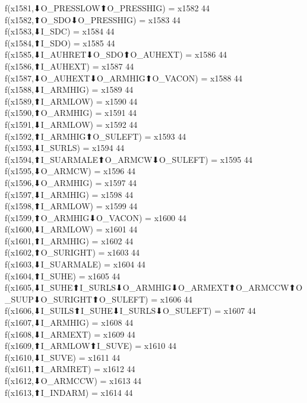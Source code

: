f(x1581,⬇O_PRESSLOW⬆O_PRESSHIG) = x1582 {44} \\
f(x1582,⬆O_SDO⬇O_PRESSHIG) = x1583 {44} \\
f(x1583,⬇I_SDC) = x1584 {44} \\
f(x1584,⬆I_SDO) = x1585 {44} \\
f(x1585,⬇I_AUHRET⬇O_SDO⬆O_AUHEXT) = x1586 {44} \\
f(x1586,⬆I_AUHEXT) = x1587 {44} \\
f(x1587,⬇O_AUHEXT⬇O_ARMHIG⬆O_VACON) = x1588 {44} \\
f(x1588,⬇I_ARMHIG) = x1589 {44} \\
f(x1589,⬆I_ARMLOW) = x1590 {44} \\
f(x1590,⬆O_ARMHIG) = x1591 {44} \\
f(x1591,⬇I_ARMLOW) = x1592 {44} \\
f(x1592,⬆I_ARMHIG⬆O_SULEFT) = x1593 {44} \\
f(x1593,⬇I_SURLS) = x1594 {44} \\
f(x1594,⬆I_SUARMALE⬆O_ARMCW⬇O_SULEFT) = x1595 {44} \\
f(x1595,⬇O_ARMCW) = x1596 {44} \\
f(x1596,⬇O_ARMHIG) = x1597 {44} \\
f(x1597,⬇I_ARMHIG) = x1598 {44} \\
f(x1598,⬆I_ARMLOW) = x1599 {44} \\
f(x1599,⬆O_ARMHIG⬇O_VACON) = x1600 {44} \\
f(x1600,⬇I_ARMLOW) = x1601 {44} \\
f(x1601,⬆I_ARMHIG) = x1602 {44} \\
f(x1602,⬆O_SURIGHT) = x1603 {44} \\
f(x1603,⬇I_SUARMALE) = x1604 {44} \\
f(x1604,⬆I_SUHE) = x1605 {44} \\
f(x1605,⬇I_SUHE⬆I_SURLS⬇O_ARMHIG⬇O_ARMEXT⬆O_ARMCCW⬆O_SUUP⬇O_SURIGHT⬆O_SULEFT) = x1606 {44} \\
f(x1606,⬇I_SUILS⬆I_SUHE⬇I_SURLS⬇O_SULEFT) = x1607 {44} \\
f(x1607,⬇I_ARMHIG) = x1608 {44} \\
f(x1608,⬇I_ARMEXT) = x1609 {44} \\
f(x1609,⬆I_ARMLOW⬆I_SUVE) = x1610 {44} \\
f(x1610,⬇I_SUVE) = x1611 {44} \\
f(x1611,⬆I_ARMRET) = x1612 {44} \\
f(x1612,⬇O_ARMCCW) = x1613 {44} \\
f(x1613,⬆I_INDARM) = x1614 {44} \\
